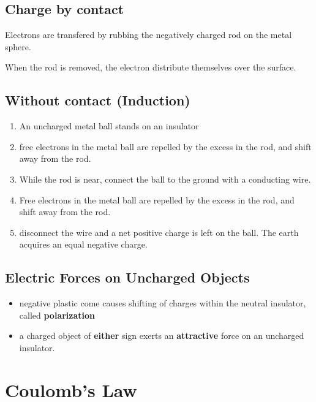 \subsection{Charge by contact}%
\label{sub:charge_by_contact}

Electrons are transfered by rubbing the negatively charged rod on the metal sphere.

When the rod is removed, the electron distribute themselves over the surface.

\subsection{Without contact (Induction)}%
\label{sub:without_contact_induction_}

\begin{enumerate}
	\item An uncharged metal ball stands on an insulator
	\item free electrons in the metal ball are repelled by the excess in the rod, and shift
		away from the rod.
	\item While the rod is near, connect the ball to the ground with a conducting wire.
	\item Free electrons in the metal ball are repelled by the excess in the rod, and shift
		away from the rod.
	\item disconnect the wire and a net positive charge is left on the ball.
		The earth acquires an equal negative charge.
\end{enumerate}

\subsection{Electric Forces on Uncharged Objects}%
\label{sub:electric_forces_on_uncharged_objects}

\begin{itemize}
	\item negative plastic come causes shifting of charges within the neutral insulator, called \textbf{polarization}
	\item a charged object of \textbf{either} sign exerts an \textbf{attractive} force on an uncharged insulator.
\end{itemize}

\section{Coulomb's Law}%
\label{sec:coulomb_s_law}

